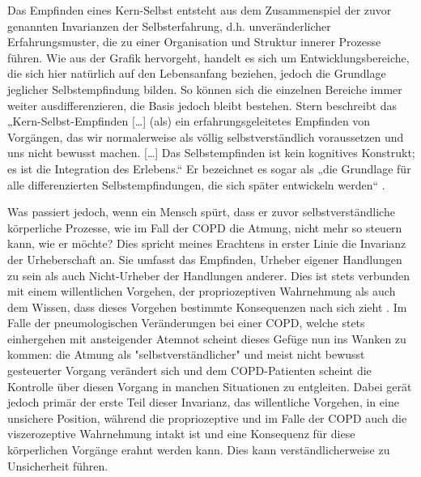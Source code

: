 Das Empfinden eines Kern-Selbst entsteht aus dem Zusammenspiel der zuvor genannten Invarianzen der Selbsterfahrung, d.h. unveränderlicher Erfahrungsmuster, die zu einer Organisation und Struktur innerer Prozesse führen. Wie aus der Grafik hervorgeht, handelt es sich um Entwicklungsbereiche, die sich hier natürlich auf den Lebensanfang beziehen, jedoch die Grundlage jeglicher Selbstempfindung bilden. So können sich die einzelnen Bereiche immer weiter ausdifferenzieren, die Basis jedoch bleibt bestehen. 
Stern beschreibt das „Kern-Selbst-Empfinden […] (als) ein erfahrungsgeleitetes Empfinden von Vorgängen, das wir normalerweise als völlig selbstverständlich voraussetzen und uns nicht bewusst machen. […] Das Selbstempfinden ist kein kognitives Konstrukt; es ist die Integration des Erlebens.“ \autocite[106f.]{stern2007} Er bezeichnet es sogar als „die Grundlage für alle differenzierten Selbstempfindungen, die sich später entwickeln werden“ \autocite[106f.]{stern2007}. 

Was passiert jedoch, wenn ein Mensch spürt, dass er zuvor selbstverständliche körperliche Prozesse, wie im Fall der COPD die Atmung, nicht mehr so steuern kann, wie er möchte? Dies spricht meines Erachtens in erster Linie die Invarianz der Urheberschaft an. Sie umfasst das Empfinden, Urheber eigener Handlungen zu sein als auch Nicht-Urheber der Handlungen anderer. Dies ist stets verbunden mit einem willentlichen Vorgehen, der propriozeptiven Wahrnehmung als auch dem Wissen, dass dieses Vorgehen bestimmte Konsequenzen nach sich zieht \autocite[vgl.][106, 114f.]{stern2007}. Im Falle der pneumologischen Veränderungen bei einer COPD, welche stets einhergehen mit ansteigender Atemnot scheint dieses Gefüge nun ins Wanken zu kommen: die Atmung als "selbstverständlicher" und meist nicht bewusst gesteuerter Vorgang verändert sich und dem COPD-Patienten scheint die Kontrolle über diesen Vorgang in manchen Situationen zu entgleiten. Dabei gerät jedoch primär der erste Teil dieser Invarianz, das willentliche Vorgehen, in eine unsichere Position, während die propriozeptive und im Falle der COPD auch die viszerozeptive Wahrnehmung intakt ist und eine Konsequenz für diese körperlichen Vorgänge erahnt werden kann. Dies kann verständlicherweise zu Unsicherheit führen.

